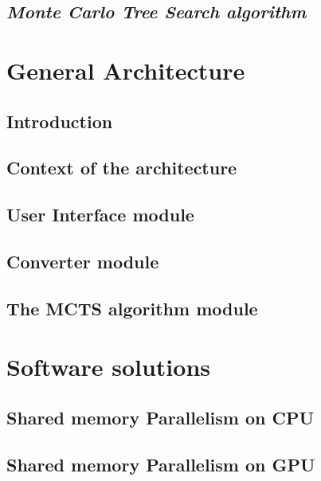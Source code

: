 \documentclass[12pt]{article}
\begin{document}
	\subsection{\textit{Monte Carlo Tree Search algorithm}}		\label{sec:mcts}			
\newpage

\section{General Architecture}					\label{sec:generalArchitecture} 		
	\subsection{Introduction}			\label{sec:gameBehavioiur}		
	\subsection{Context of the architecture}		\label{sec:globalview}			
	\subsection{User Interface module}				\label{sec:ui}				
	\subsection{Converter module}		\label{sec:api}				
	\subsection{The MCTS algorithm module}		\label{sec:mctss}				
\newpage

\section{Software solutions}					\label{sec:softwareSolutions}
	\subsection{Shared memory Parallelism on CPU}	\label{sec:openmp}			
	\subsection{Shared memory Parallelism on GPU}	\label{sec:openacc}			
\end{document}
